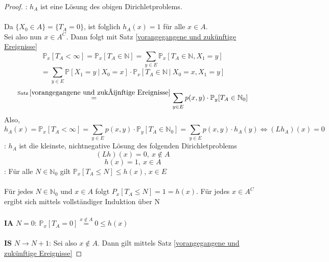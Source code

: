 \documentclass[a4paper,12pt]{scrartcl}
\theoremstyle{definition}
\begin{document}
\begin{proof}
: $h_{A}$ ist eine Lösung des obigen Dirichletproblems.
\\
\\
Da $\lbrace X_{0} \in A \rbrace = \lbrace T_{A} = 0 \rbrace$, ist folglich $h_{A}(x) = 1$ für alle $x \in A$.
\\
Sei also nun $x \in A^{C}$. Dann folgt mit Satz \ref{vorangegangene und zukünftige Ereignisse}
\begin{equation*}
\mathbb{P}_{x}[T_{A} < \infty] = \mathbb{P}_{x}[T_{A} \in \mathbb{N}] = \sum_{y \in E} \mathbb{P}_{x}[T_{A} \in \mathbb{N}, X_{1} = y]
\end{equation*}
\begin{equation*}
= \sum_{y \in E} \mathbb{P}[X_{1} = y \: | \: X_{0} = x] \cdot \mathbb{P}_{\nu}[T_{A} \in \mathbb{N} \: | \: X_{0} = x, X_{1} = y]
\end{equation*}
\begin{equation*}
\stackrel{\mathrm{Satz} \: \ref{vorangegangene und zukünftige Ereignisse}}{=} \sum_{y \in E} p(x,y) \cdot \mathbb{P}_{y}[T_{A} \in \mathbb{N}_{0}]
\end{equation*}
Also,
\begin{equation*}
h_{A}(x) = \mathbb{P}_{x}[T_{A} < \infty] = \sum_{y \in E} p(x,y) \cdot \mathbb{P}_{y}[T_{A} \in \mathbb{N}_{0}] = \sum_{y \in E} p(x,y) \cdot h_{A}(y) \Leftrightarrow (Lh_{A})(x) = 0
\end{equation*}
: $h_{A}$ ist die kleinste, nichtnegative Lösung des folgenden Dirichletproblems
\begin{equation*}
(Lh)(x) = 0, \: x \notin A
\end{equation*}
\begin{equation*}
h(x) = 1, \: x \in A
\end{equation*}
: Für alle $N \in \mathbb{N}_{0}$ gilt $\mathbb{P}_{x}[T_{A} \leq N] \leq h(x)$, $x \in E$
\\
\\
Für jedes $N \in \mathbb{N}_{0}$ und $x \in A$ folgt $P_{x}[T_{A} \leq N] = 1 = h(x)$. Für jedes $x \in A^{C}$ ergibt sich mittels vollständiger Induktion über N
\\
\\
\textbf{IA} $N=0$: $\mathbb{P}_{x}[T_{A} = 0] \stackrel{x \notin A}{=}0 \leq h(x)$
\\
\\
\textbf{IS} $N \to N+1$: Sei also $x \notin A$. Dann gilt mittels Satz \ref{vorangegangene und zukünftige Ereignisse}

\end{proof}
\end{document}

